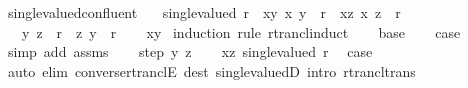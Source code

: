 \begin{isabellebody}
\ single{\isacharunderscore}{\kern0pt}valued{\isacharunderscore}{\kern0pt}confluent{\isacharcolon}{\kern0pt}\isanewline
\ \ \ {\isachardoublequoteopen}single{\isacharunderscore}{\kern0pt}valued\ r{\isachardoublequoteclose}\ \ xy{\isacharcolon}{\kern0pt}\ {\isachardoublequoteopen}{\isacharparenleft}{\kern0pt}x{\isacharcomma}{\kern0pt}\ y{\isacharparenright}{\kern0pt}\ {\isasymin}\ r\isactrlsup {\isacharasterisk}{\kern0pt}{\isachardoublequoteclose}\ \ xz{\isacharcolon}{\kern0pt}\ {\isachardoublequoteopen}{\isacharparenleft}{\kern0pt}x{\isacharcomma}{\kern0pt}\ z{\isacharparenright}{\kern0pt}\ {\isasymin}\ r\isactrlsup {\isacharasterisk}{\kern0pt}{\isachardoublequoteclose}\isanewline
\ \ \ {\isachardoublequoteopen}{\isacharparenleft}{\kern0pt}y{\isacharcomma}{\kern0pt}\ z{\isacharparenright}{\kern0pt}\ {\isasymin}\ r\isactrlsup {\isacharasterisk}{\kern0pt}\ {\isasymor}\ {\isacharparenleft}{\kern0pt}z{\isacharcomma}{\kern0pt}\ y{\isacharparenright}{\kern0pt}\ {\isasymin}\ r\isactrlsup {\isacharasterisk}{\kern0pt}{\isachardoublequoteclose}\isanewline
%
\isadelimproof
\ \ %
\endisadelimproof
%
\isatagproof
{}\isamarkupfalse%
\ xy\isanewline
{}\isamarkupfalse%
\ {\isacharparenleft}{\kern0pt}induction\ rule{\isacharcolon}{\kern0pt}\ rtrancl{\isacharunderscore}{\kern0pt}induct{\isacharparenright}{\kern0pt}\isanewline
\ \ \isamarkupfalse%
\ base\isanewline
\ \ \isamarkupfalse%
\ {\isacharquery}{\kern0pt}case\isanewline
\ \ \ \ \isamarkupfalse%
\ {\isacharparenleft}{\kern0pt}simp\ add{\isacharcolon}{\kern0pt}\ assms{\isacharparenright}{\kern0pt}\isanewline
{}\isamarkupfalse%
\isanewline
\ \ \isamarkupfalse%
\ {\isacharparenleft}{\kern0pt}step\ y\ z{\isacharparenright}{\kern0pt}\isanewline
\ \ \isamarkupfalse%
\ xz\ {\isacartoucheopen}single{\isacharunderscore}{\kern0pt}valued\ r{\isacartoucheclose}\ \isamarkupfalse%
\ {\isacharquery}{\kern0pt}case\isanewline
\ \ \ \ \isamarkupfalse%
\ {\isacharparenleft}{\kern0pt}auto\ elim{\isacharcolon}{\kern0pt}\ converse{\isacharunderscore}{\kern0pt}rtranclE\ dest{\isacharcolon}{\kern0pt}\ single{\isacharunderscore}{\kern0pt}valuedD\ intro{\isacharcolon}{\kern0pt}\ rtrancl{\isacharunderscore}{\kern0pt}trans{\isacharparenright}{\kern0pt}\isanewline
{}\isamarkupfalse%
%
\endisatagproof
{\isafoldproof}%
%
\isadelimproof
\isanewline
%
\endisadelimproof
\isanewline
{}\isamarkupfalse%

\end{isabellebody}
